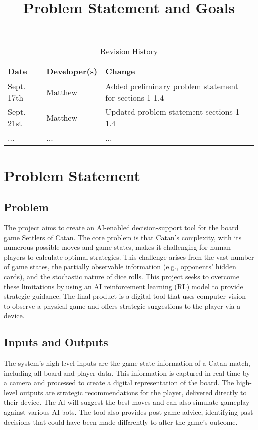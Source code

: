 \documentclass{article}
\title{Problem Statement and Goals\\\progname}
\author{\authname}
\date{}
\begin{document}
\maketitle

\begin{table}[hp]
\caption{Revision History} \label{TblRevisionHistory}
\begin{tabularx}{\textwidth}{llX}
\toprule
\textbf{Date} & \textbf{Developer(s)} & \textbf{Change}\\
\midrule
Sept. 17th & Matthew & Added preliminary problem statement for sections 1-1.4\\
Sept. 21st & Matthew & Updated problem statement sections 1-1.4\\
... & ... & ...\\
\bottomrule
\end{tabularx}
\end{table}

\section{Problem Statement}

\subsection{Problem}
The project aims to create an AI-enabled decision-support tool for the board game Settlers of Catan. The core problem is that Catan's complexity, with its numerous possible moves and game states, makes it challenging for human players to calculate optimal strategies. This challenge arises from the vast number of game states, the partially observable information (e.g., opponents' hidden cards), and the stochastic nature of dice rolls. This project seeks to overcome these limitations by using an AI reinforcement learning (RL) model to provide strategic guidance. The final product is a digital tool that uses computer vision to observe a physical game and offers strategic suggestions to the player via a device.

\subsection{Inputs and Outputs}
The system's high-level inputs are the game state information of a Catan match, including all board and player data. This information is captured in real-time by a camera and processed to create a digital representation of the board. The high-level outputs are strategic recommendations for the player, delivered directly to their device. The AI will suggest the best moves and can also simulate gameplay against various AI bots. The tool also provides post-game advice, identifying past decisions that could have been made differently to alter the game's outcome.
\end{document}
